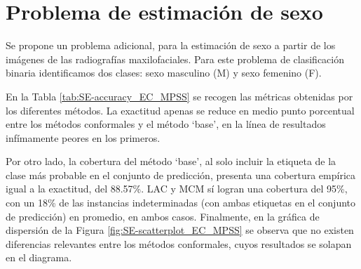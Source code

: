 \chapter{Problema de estimación de sexo}
\label{chap:sex_estimation}

Se propone un problema adicional, para la estimación de sexo a partir de los imágenes de las radiografías maxilofaciales. Para este problema de clasificación binaria identificamos dos clases: sexo masculino (M) y sexo femenino (F).



En la Tabla \ref{tab:SE-accuracy_EC_MPSS} se recogen las métricas obtenidas por los diferentes métodos. La exactitud apenas se reduce en medio punto porcentual entre los métodos conformales y el método `base', en la línea de resultados infímamente peores en los primeros.

Por otro lado, la cobertura del método `base', al solo incluir la etiqueta de la clase más probable en el conjunto de predicción, presenta una cobertura empírica igual a la exactitud, del 88.57\%. LAC y MCM sí logran una cobertura del 95\%, con un 18\% de las instancias indeterminadas (con ambas etiquetas en el conjunto de predicción) en promedio, en ambos casos. Finalmente, en la gráfica de dispersión de la Figura \ref{fig:SE-scatterplot_EC_MPSS} se observa que no existen diferencias relevantes entre los métodos conformales, cuyos resultados se solapan en el diagrama.

